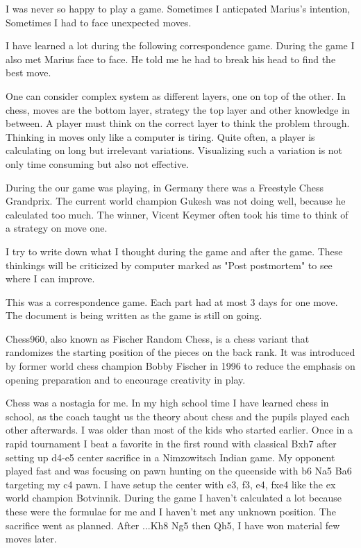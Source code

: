 
I was never so happy to play a game. Sometimes I anticpated Marius's intention, Sometimes
I had to face unexpected moves. 

I have learned a lot during the following correspondence game. During the game I also met 
Marius face to face. He told me he had to break his head to find the best move.  

One can consider complex system as different layers, one on top of the other.  In chess,
moves are the bottom layer, strategy the top layer and other knowledge in between. A player
must think on the correct layer to think the problem through. Thinking in moves only
like a computer is tiring. Quite often, a player is calculating on long but irrelevant
variations. Visualizing such a variation is not only time consuming but also not
effective. 

During the our game was playing, in Germany there was a Freestyle Chess Grandprix. The 
current world champion Gukesh was not doing well, because he calculated too much. The
winner, Vicent Keymer often took his time to think of a strategy on move one.

I try to write down what I thought during the game and after the game. 
These thinkings will be criticized by computer marked as "Post postmortem" to see 
where I can improve.


\newchessgame[
id=main,
moveid=1w,
setwhite={pa2, pb2, pc2, pd2, pe2, pf2, pg2, ph2, ra1, nb1, nc1, kd1, qe1, bf1, bg1, rh1},
addblack={pa7, pb7, pc7, pd7, pe7, pf7, pg7, ph7, ra8, nb8, nc8, kd8, qe8, bf8, bg8, rh8},
storefen=start]

This was a correspondence game. Each part had at most 3 days for one move. The document is being written as the game is still on going.

Chess960, also known as Fischer Random Chess, is a chess variant that randomizes the starting position of the pieces on the back rank. It was introduced by former world chess champion Bobby Fischer in 1996 to reduce the emphasis on opening preparation and to encourage creativity in play.

Chess was a nostagia for me. In my high school time I have learned chess in school, as the coach taught us the theory about chess and the pupils played each other afterwards. I was older than most of the kids who started earlier. 
Once in a rapid tournament I beat a favorite in the first round with classical Bxh7 after setting up d4-e5 center sacrifice in a Nimzowitsch Indian game. My opponent played fast and was focusing on pawn hunting
on the queenside with b6 Na5 Ba6 targeting my c4 pawn. I have setup the center with e3, f3, e4, fxe4 like the ex world champion Botvinnik. During the game I haven't calculated
a lot because these were the formulae for me and I haven't met any unknown position. The sacrifice went as planned. After ...Kh8 Ng5 then Qh5, I have won material few moves later. 

